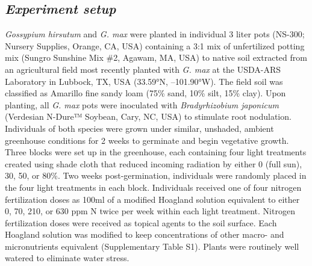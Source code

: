 \subsection{\textit{Experiment setup}}
\textit{Gossypium hirsutum} and \textit{G. max} were planted in individual 3 liter pots (NS-300; Nursery Supplies, Orange, CA, USA) containing a 3:1 mix of unfertilized potting mix (Sungro Sunshine Mix \#2, Agawam, MA, USA) to native soil extracted from an agricultural field most recently planted with \textit{G. max} at the USDA-ARS Laboratory in Lubbock, TX, USA (33.59°N, –101.90°W). The field soil was classified as Amarillo fine sandy loam (75\% sand, 10\% silt, 15\% clay). Upon planting, all \textit{G. max} pots were inoculated with \textit{Bradyrhizobium japonicum} (Verdesian N-Dure™ Soybean, Cary, NC, USA) to stimulate root nodulation. Individuals of both species were grown under similar, unshaded, ambient greenhouse conditions for 2 weeks to germinate and begin vegetative growth. Three blocks were set up in the greenhouse, each containing four light treatments created using shade cloth that reduced incoming radiation by either 0 (full sun), 30, 50, or 80\%. Two weeks post-germination, individuals were randomly placed in the four light treatments in each block. Individuals received one of four nitrogen fertilization doses as 100ml of a modified Hoagland solution  equivalent to either 0, 70, 210, or 630 ppm N twice per week within each light treatment. Nitrogen fertilization doses were received as topical agents to the soil surface. Each Hoagland solution was modified to keep concentrations of other macro- and micronutrients equivalent (Supplementary Table S1). Plants were routinely well watered to eliminate water stress.

